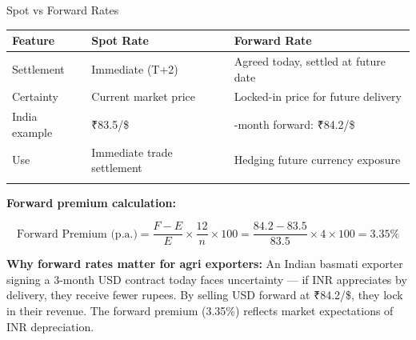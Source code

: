 \documentclass[
  ignorenonframetext,
  aspectratio=169,
]{beamer}
\makeatletter
\let\quarto@originallabel\label
\DeclareRobustCommand*{\label}[1]{\quarto@originallabel{#1}}
\makeatother
\begin{document}
\begin{frame}{Spot vs Forward Rates}
\label{spot-vs-forward-rates}
\begin{longtable}[]{@{}
  >{\raggedright\arraybackslash}p{}
  >{\raggedright\arraybackslash}p{}
  >{\raggedright\arraybackslash}p{}@{}}
\toprule\noalign{}
\begin{minipage}[b]{\linewidth}\raggedright
Feature
\end{minipage} & \begin{minipage}[b]{\linewidth}\raggedright
Spot Rate
\end{minipage} & \begin{minipage}[b]{\linewidth}\raggedright
Forward Rate
\end{minipage} \\
\midrule\noalign{}
\endhead
Settlement & Immediate (T+2) & Agreed today, settled at future date \\
Certainty & Current market price & Locked-in price for future
delivery \\
India example & ₹83.5/\$ & 3-month forward: ₹84.2/\$ \\
Use & Immediate trade settlement & Hedging future currency exposure \\
\bottomrule\noalign{}
\end{longtable}

\textbf{Forward premium calculation:}

\[\text{Forward Premium (p.a.)} = \frac{F - E}{E} \times \frac{12}{n} \times 100 = \frac{84.2 - 83.5}{83.5} \times 4 \times 100 = 3.35\%\]

\textbf{Why forward rates matter for agri exporters:} An Indian basmati
exporter signing a 3-month USD contract today faces uncertainty --- if
INR appreciates by delivery, they receive fewer rupees. By selling USD
forward at ₹84.2/\$, they lock in their revenue. The forward premium
(3.35\%) reflects market expectations of INR depreciation.
\end{frame}
\end{document}
